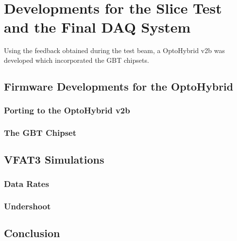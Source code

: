 \chapter{Developments for the Slice Test and the Final DAQ System}
\label{chap:II-4-slice-test}

  Using the feedback obtained during the test beam, a OptoHybrid v2b was developed which incorporated the GBT chipsets. 

  \section{Firmware Developments for the OptoHybrid}

    \subsection{Porting to the OptoHybrid v2b}

    \subsection{The GBT Chipset}

  \section{VFAT3 Simulations}

    \subsection{Data Rates}

    \subsection{Undershoot}

  \section{Conclusion}
